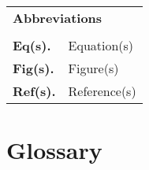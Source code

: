 \vfill
\newpage

\begin{table}[H]
\begin{tabular}{ll}
	\multicolumn{2}{l}{\large \bf Abbreviations}\\
	\\
	\bf Eq(s). 		& Equation(s) \\
	\bf Fig(s). 		& Figure(s) \\
	\bf Ref(s).		& Reference(s) \\
\end{tabular}
\end{table}


\chapter*{Glossary}


